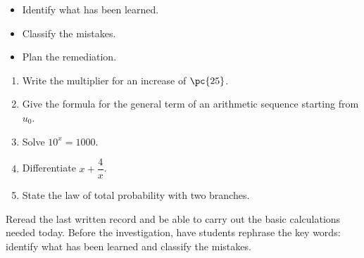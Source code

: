 \begin{objectives}\begin{itemize}\item Identify what has been learned.\item Classify the mistakes.\item Plan the remediation.\end{itemize}\end{objectives}
\begin{fluency}\begin{enumerate}\item Write the multiplier for an increase of $\pc{25}$. \item Give the formula for the general term of an arithmetic sequence starting from $u_0$. \item Solve $10^x=1000$. \item Differentiate $x+\dfrac4x$. \item State the law of total probability with two branches. \end{enumerate}\end{fluency}
\begin{prerequisites}Reread the last written record and be able to carry out the basic calculations needed today. Before the investigation, have students rephrase the key words: identify what has been learned and classify the mistakes.\end{prerequisites}

